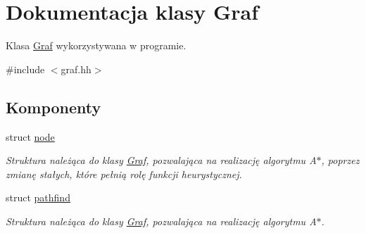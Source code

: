 \hypertarget{class_graf}{\section{\-Dokumentacja klasy \-Graf}
\label{class_graf}
}


\-Klasa \hyperlink{class_graf}{\-Graf} wykorzystywana w programie.  




{\ttfamily \#include $<$graf.\-hh$>$}

\subsection*{\-Komponenty}
\begin{DoxyCompactItemize}
\item 
struct \hyperlink{struct_graf_1_1node}{node}
\begin{DoxyCompactList}\small\item\em \-Struktura należąca do klasy \hyperlink{class_graf}{\-Graf}, pozwalająca na realizację algorytmu \-A$\ast$, poprzez zmianę stałych, które pełnią rolę funkcji heurystycznej. \end{DoxyCompactList}\item 
struct \hyperlink{struct_graf_1_1pathfind}{pathfind}
\begin{DoxyCompactList}\small\item\em \-Struktura należąca do klasy \hyperlink{class_graf}{\-Graf}, pozwalająca na realizację algorytmu \-A$\ast$. \end{DoxyCompactList}\end{DoxyCompactItemize}
